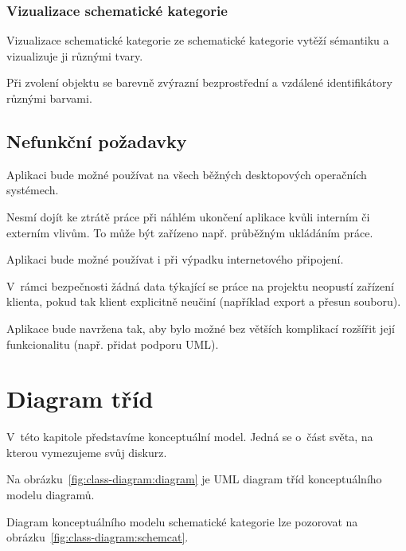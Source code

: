 \subsubsection*{Vizualizace schematické kategorie}
\begin{enumfp}[resume]
  \item Vizualizace schematické kategorie ze schematické kategorie vytěží sémantiku a vizualizuje ji různými tvary.
  \item Při zvolení objektu se barevně zvýrazní bezprostřední a vzdálené identifikátory různými barvami.
\end{enumfp}

\subsection{Nefunkční požadavky}

\begin{enumnfp}
  \item Aplikaci bude možné používat na všech běžných desktopových operačních systémech.
  \item Nesmí dojít ke ztrátě práce při náhlém ukončení aplikace kvůli interním či externím vlivům.
  To může být zařízeno např. průběžným ukládáním práce.
  \item Aplikaci bude možné používat i při výpadku internetového připojení.
  \item V~rámci bezpečnosti žádná data týkající se práce na projektu neopustí zařízení klienta, pokud tak klient explicitně neučiní (například export a přesun souboru).
  \item Aplikace bude navržena tak, aby bylo možné bez větších komplikací rozšířit její funkcionalitu (např. přidat podporu UML).
\end{enumnfp}

\section{Diagram tříd}

V~této kapitole představíme konceptuální model.
Jedná se o~část světa, na kterou vymezujeme svůj diskurz.

Na obrázku~\ref{fig:class-diagram:diagram} je UML diagram tříd konceptuálního modelu diagramů.

Diagram konceptuálního modelu schematické kategorie lze pozorovat na obrázku~\ref{fig:class-diagram:schemcat}.


